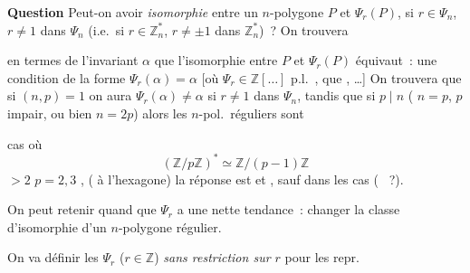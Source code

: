 \documentclass[11pt,a4paper]{article}
\begin{document}
\textbf{Question} Peut-on avoir \emph{isomorphie} entre un $n$-polygone  $P$ et $\Psi_r(P)$, si $r \in \Psi_n$, $r \neq 1$ dans $\Psi_n$ (i.e.\ si $r \in \mathbb{Z}_n^{*}$, $r \neq \pm 1$ dans $\mathbb{Z}_n^{*}$)~? On trouvera

en termes de l'invariant $\alpha$ que \struck{\ill{}} l'isomorphie entre $P$ et $\Psi_r(P)$ équivaut~: une condition de la forme $\Psi_r(\alpha) = \alpha$ [où $\Psi_r \in \mathbb{Z}[\ldots]$ \ill{} \ill{} \ill{} p.l.\ , \ill{}  que \ill{},  \ill{} …] On trouvera \struck{\ill{}} que si $(n, p) = 1$ on aura $\Psi_r(\alpha) \neq \alpha$ si $r \neq 1$ dans $\Psi_n$, tandis que si  $p \mid n$ \ill{} ( $n = p$, $p$ impair, ou bien $n = 2p$) alors  les $n$-pol.\ réguliers sont 

   cas où \struck{\ill{}} 
\[
  (\mathbb{Z}/p\mathbb{Z})^{*} \simeq \mathbb{Z}/(p-1)\mathbb{Z}
\]
  $> 2$  $p = 2, 3$ , \ill{} ( à l'hexagone) la réponse est  et , sauf dans les  \ill{} \struck{\ill{}}  cas   ( \ill{} \ill{}~?).

On peut retenir quand  que $\Psi_r$ a une nette tendance~: changer la classe d'isomorphie d'un $n$-polygone régulier. 

On va définir les $\Psi_r$ ($r \in \mathbb{Z}$) \emph{sans restriction sur $r$} pour les repr.
\end{document}
